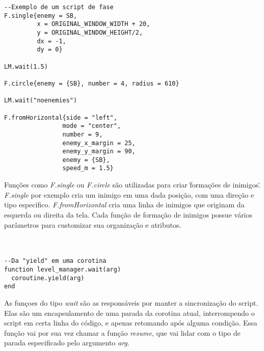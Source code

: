\begin{lstlisting}[language={[5.0]lua}]
--Exemplo de um script de fase
F.single{enemy = SB,
         x = ORIGINAL_WINDOW_WIDTH + 20,
         y = ORIGINAL_WINDOW_HEIGHT/2,
         dx = -1,
         dy = 0}

LM.wait(1.5)

F.circle{enemy = {SB}, number = 4, radius = 610}

LM.wait("noenemies")

F.fromHorizontal{side = "left",
                mode = "center",
                number = 9,
                enemy_x_margin = 25,
                enemy_y_margin = 90,
                enemy = {SB},
                speed_m = 1.5}
\end{lstlisting}

Funções como \textit{F.single} ou \textit{F.circle} são utilizadas para criar \"formações de inimigos\". \textit{F.single} por exemplo cria um inimigo em uma dada posição, com uma direção e tipo específico. \textit{F.fromHorizontal} cria uma linha de inimigos que originam da esquerda ou direita da tela. Cada função de formação de inimigos possue vários parâmetros para customizar sua organização e atributos.\\\\\\

\begin{lstlisting}[language={[5.0]lua}]
--Da "yield" em uma corotina
function level_manager.wait(arg)
  coroutine.yield(arg)
end
\end{lstlisting}

As funçoes do tipo \textit{wait} são as responsáveis por manter a sincronização do script. Elas são um encapsulamento de uma parada da corotina atual, interrompendo o script em certa linha do código, e apenas retomando após alguma condição. Essa função vai por sua vez chamar a função \textit{resume}, que vai lidar com o tipo de parada especificado pelo argumento \textit{arg}.

